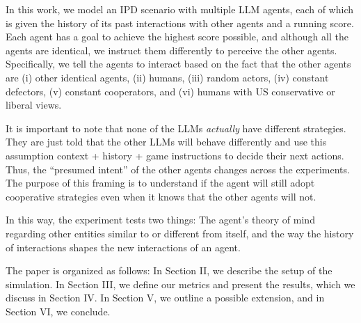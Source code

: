 \documentclass[%
 reprint,
 amsmath,amssymb,
 aps,
]{revtex4-2}
\begin{document}
In this work, we model an IPD scenario with multiple LLM agents, each of which is given the history of its past interactions with other agents and a running score. Each agent has a goal to achieve the highest score possible, and although all the agents are identical, we instruct them differently to perceive the other agents. Specifically, we tell the agents to interact based on the fact that the other agents are (i) other identical agents, (ii) humans, (iii) random actors, (iv) constant defectors, (v) constant cooperators, and (vi) humans with US conservative or liberal views.

It is important to note that none of the LLMs \textit{actually} have different strategies. They are just told that the other LLMs will behave differently and use this assumption context + history + game instructions to decide their next actions. Thus, the ``presumed intent'' of the other agents changes across the experiments. The purpose of this framing is to understand if the agent will still adopt cooperative strategies even when it knows that the other agents will not. 

In this way, the experiment tests two things: The agent's theory of mind regarding other entities similar to or different from itself,  and the way the history of interactions shapes the new interactions of an agent.

The paper is organized as follows: In Section II, we describe the setup of the simulation. In Section III, we define our metrics and present the results, which we discuss in Section IV. In Section V, we outline a possible extension, and in Section VI, we conclude.


\end{document}
